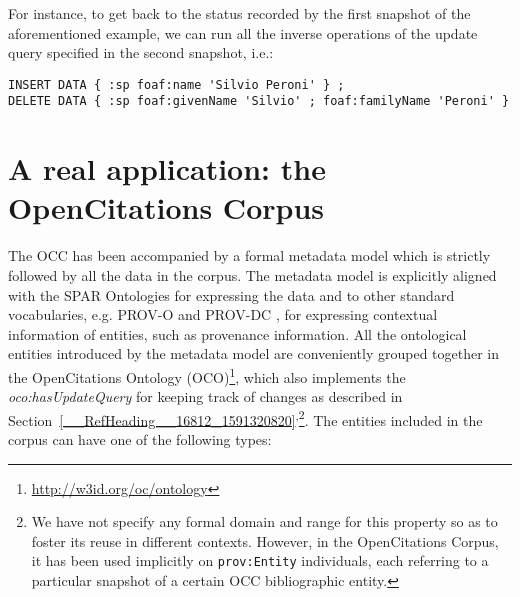 \documentclass[runningheads,a4paper]{llncs}
\begin{document}
For instance, to get back to the status recorded by the first snapshot of the aforementioned example, we can run all the inverse operations of the update query specified in the second snapshot, i.e.:

\begin{lstlisting}[mathescape]
INSERT DATA { :sp foaf:name 'Silvio Peroni' } ;
DELETE DATA { :sp foaf:givenName 'Silvio' ; foaf:familyName 'Peroni' }
\end{lstlisting}

\section{A real application: the OpenCitations Corpus}\label{__RefHeading__16814_1591320820}

The OCC has been accompanied by a formal metadata model  \cite{__RefNumPara__19064_1591320820} which is strictly followed by all the data in the corpus. The metadata model is explicitly aligned with the SPAR Ontologies  \cite{__RefNumPara__19067_1591320820} for expressing the data and to other standard vocabularies, e.g. PROV-O  \cite{__RefNumPara__17349_1591320820} and PROV-DC  \cite{__RefNumPara__17595_1591320820}, for expressing contextual information of entities, such as provenance information. All the ontological entities introduced by the metadata model are conveniently grouped together in the OpenCitations Ontology (OCO)\footnote{\url{http://w3id.org/oc/ontology}}, which also implements the {\em oco:hasUpdateQuery} for keeping track of changes as described in Section~\ref{__RefHeading__16812_1591320820}\textsuperscript{,}\footnote{We have not specify any formal domain and range for this property so as to foster its reuse in different contexts. However, in the OpenCitations Corpus, it has been used implicitly on \Verb+prov:Entity+ individuals, each referring to a particular snapshot of a certain OCC bibliographic entity.}. The entities included in the corpus can have one of the following types:
\end{document}
